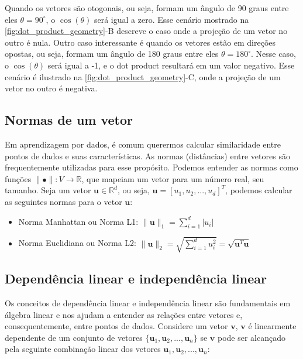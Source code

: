 Quando os vetores são otogonais, ou seja, formam um ângulo de 90 graus entre eles $\theta = 90^\circ$, o $\cos(\theta)$ será igual a zero. Esse cenário mostrado na \ref{fig:dot_product_geometry}-B descreve o caso onde a projeção de um vetor no outro é nula. Outro caso interessante é quando os vetores estão em direções opostas, ou seja, formam um ângulo de 180 graus entre eles $\theta = 180^\circ$. Nesse caso, o $\cos(\theta)$ será igual a -1, e o dot product resultará em um valor negativo. Esse cenário é ilustrado na \ref{fig:dot_product_geometry}-C, onde a projeção de um vetor no outro é negativa.

\subsection{Normas de um vetor}
Em aprendizagem por dados, é comum querermos calcular similaridade entre pontos de dados e suas características. As normas (distâncias) entre vetores são frequentemente utilizadas para esse propósito. Podemos entender as normas como funções $\lVert \bullet \rVert: V \rightarrow \mathbb{R}$, que mapeiam um vetor para um número real, seu tamanho. Seja um vetor $\mathbf{u} \in \mathbb{R}^d$, ou seja, $\mathbf{u} = [u_1, u_2, ..., u_d]^T$, podemos calcular as seguintes normas para o vetor $\mathbf{u}$:

\begin{itemize}
    \item Norma Manhattan ou Norma L1: $\|\mathbf{u}\|_1 = \sum_{i=1}^{d} |u_i|$
    \item Norma Euclidiana ou Norma L2: $\|\mathbf{u}\|_2 = \sqrt{\sum_{i=1}^{d} u_i^2} = \sqrt{\mathbf{u}^T \mathbf{u}}$ 
\end{itemize}




\subsection{Dependência linear e independência linear}

Os conceitos de dependência linear e independência linear são fundamentais em álgebra linear e nos ajudam a entender as relações entre vetores e, consequentemente, entre pontos de dados. Considere um vetor $\mathbf{v}$, $\mathbf{v}$ é linearmente dependente de um conjunto de vetores $\{\mathbf{u}_1, \mathbf{u}_2, ..., \mathbf{u}_n\}$ se $\mathbf{v}$ pode ser alcançado pela seguinte combinação linear dos vetores $\mathbf{u}_1, \mathbf{u}_2, ..., \mathbf{u}_n$:

